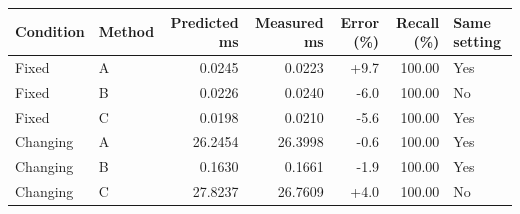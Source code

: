 \begin{tabular}{@{}llrrrrl@{}}
\toprule
Condition & Method & Predicted ms & Measured ms & Error (\%) & Recall (\%) & Same setting \\
\midrule
Fixed & A & 0.0245 & 0.0223 & +9.7 & 100.00 & Yes \\
Fixed & B & 0.0226 & 0.0240 & -6.0 & 100.00 & No \\
Fixed & C & 0.0198 & 0.0210 & -5.6 & 100.00 & Yes \\
Changing & A & 26.2454 & 26.3998 & -0.6 & 100.00 & Yes \\
Changing & B & 0.1630 & 0.1661 & -1.9 & 100.00 & Yes \\
Changing & C & 27.8237 & 26.7609 & +4.0 & 100.00 & No \\
\bottomrule
\end{tabular}
